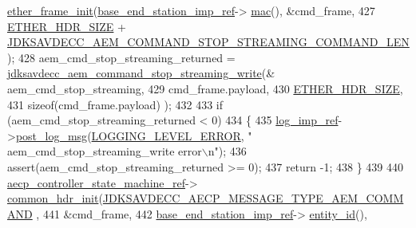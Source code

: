 \begin{DoxyCode}
      \hyperlink{classavdecc__lib_1_1aecp__controller__state__machine_a86ff947c5e6b799cfb877d3767bfa1f9}{ether\_frame\_init}(\hyperlink{classavdecc__lib_1_1descriptor__base__imp_a550c969411f5f3b69f55cc139763d224}{base\_end\_station\_imp\_ref}->
      \hyperlink{classavdecc__lib_1_1end__station__imp_a08e1bd1861b3b8f447ea374a65ac11f9}{mac}(), &cmd\_frame,
427                                                         \hyperlink{namespaceavdecc__lib_a6c827b1a0d973e18119c5e3da518e65ca9512ad9b34302ba7048d88197e0a2dc0}{ETHER\_HDR\_SIZE} + 
      \hyperlink{group__command__stop__streaming_ga37e2bec2217af78aed138bbf254234d0}{JDKSAVDECC\_AEM\_COMMAND\_STOP\_STREAMING\_COMMAND\_LEN});
428     aem\_cmd\_stop\_streaming\_returned = 
      \hyperlink{group__command__stop__streaming_gab694a591019d29c8fa77482ac3a43f88}{jdksavdecc\_aem\_command\_stop\_streaming\_write}(&
      aem\_cmd\_stop\_streaming,
429                                                                                   cmd\_frame.payload,
430                                                                                   
      \hyperlink{namespaceavdecc__lib_a6c827b1a0d973e18119c5e3da518e65ca9512ad9b34302ba7048d88197e0a2dc0}{ETHER\_HDR\_SIZE},
431                                                                                   \textcolor{keyword}{sizeof}(cmd\_frame.payload)
      );
432 
433     \textcolor{keywordflow}{if} (aem\_cmd\_stop\_streaming\_returned < 0)
434     \{
435         \hyperlink{namespaceavdecc__lib_acbe3e2a96ae6524943ca532c87a28529}{log\_imp\_ref}->\hyperlink{classavdecc__lib_1_1log_a68139a6297697e4ccebf36ccfd02e44a}{post\_log\_msg}(\hyperlink{namespaceavdecc__lib_a501055c431e6872ef46f252ad13f85cdaf2c4481208273451a6f5c7bb9770ec8a}{LOGGING\_LEVEL\_ERROR}, \textcolor{stringliteral}{"
      aem\_cmd\_stop\_streaming\_write error\(\backslash\)n"});
436         assert(aem\_cmd\_stop\_streaming\_returned >= 0);
437         \textcolor{keywordflow}{return} -1;
438     \}
439 
440     \hyperlink{namespaceavdecc__lib_a0b1b5aea3c0490f77cbfd9178af5be22}{aecp\_controller\_state\_machine\_ref}->
      \hyperlink{classavdecc__lib_1_1aecp__controller__state__machine_aafc737d7ed17a62fed9df6528f18d3ec}{common\_hdr\_init}(\hyperlink{group__aecp__message__type_ga4625ce189cc209f42deb0629f48faf69}{JDKSAVDECC\_AECP\_MESSAGE\_TYPE\_AEM\_COMMAND}
      ,
441                                                        &cmd\_frame,
442                                                        \hyperlink{classavdecc__lib_1_1descriptor__base__imp_a550c969411f5f3b69f55cc139763d224}{base\_end\_station\_imp\_ref}->
      \hyperlink{classavdecc__lib_1_1end__station__imp_a363b6c9664a0d701def9b17863e20ad3}{entity\_id}(),

\end{DoxyCode}
